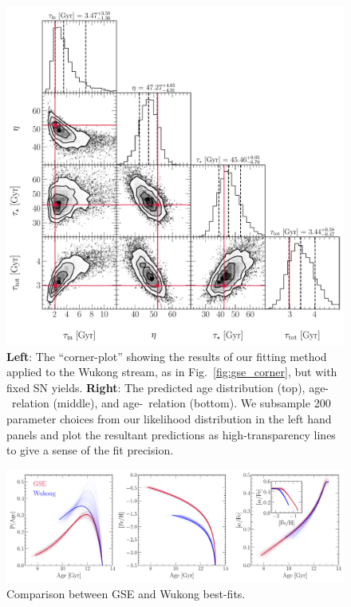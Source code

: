 \documentclass[ms.tex]{subfiles}
\begin{document}
\begin{figure}
\centering
\includegraphics[scale = 0.50]{wukong_expifr_102k4.pdf}
\caption{
\textbf{Left}: The ``corner-plot'' showing the results of our fitting method
applied to the Wukong stream, as in Fig.~\ref{fig:gse_corner}, but with fixed
SN yields.
\textbf{Right}: The predicted age distribution (top), age-\feh~relation
(middle), and age-\afe~relation (bottom).
We subsample 200 parameter choices from our likelihood distribution in the
left hand panels and plot the resultant predictions as high-transparency lines
to give a sense of the fit precision.
}
\label{fig:wukong_corner}
\end{figure}

\begin{figure}
\centering
\includegraphics[scale = 0.50]{gse_wukong_comparison.pdf}
\caption{
Comparison between GSE and Wukong best-fits.
}
\label{fig:gse_wukong_comp}
\end{figure}
\end{document}
